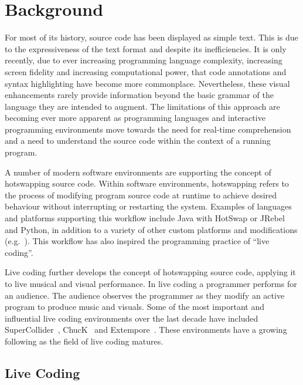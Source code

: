 

\section{Background}

For most of its history, source code has been displayed as simple text. This is due to the expressiveness of the text format and despite its inefficiencies.
It is only recently, due to ever increasing programming language complexity, increasing screen fidelity and increasing computational power, that code annotations and syntax highlighting have become more commonplace. Nevertheless, these visual enhancements rarely provide information beyond the basic grammar of the language they are intended to augment. The limitations of this approach are becoming ever more apparent as programming languages and interactive programming environments move towards the need for real-time comprehension and a need to understand the source code within the context of a running program.

A number of modern software environments are supporting the concept of hotswapping source code. Within software environments, hotswapping refers to the process of modifying program source code at runtime to achieve desired behaviour without interrupting or restarting the system. Examples of languages and platforms supporting this workflow include Java with HotSwap or JRebel~\cite{ZeroTurnaround2014} and Python, in addition to a variety of other custom platforms and modifications (e.g.~\cite{Thomas2011}). This workflow has also inspired the programming practice of ``live coding''. 

Live coding further develops the concept of hotswapping source code, applying it to live musical and visual performance. In live coding a programmer performs for an audience. The audience observes the programmer as they modify an active program to produce music and visuals. Some of the most important and influential live coding environments over the last decade have included SuperCollider~\cite{McCartney}, ChucK~\cite{Wang2008} and Extempore~\cite{Sorensen}. These environments have a growing following as the field of live coding matures.

\subsection{Live Coding}

